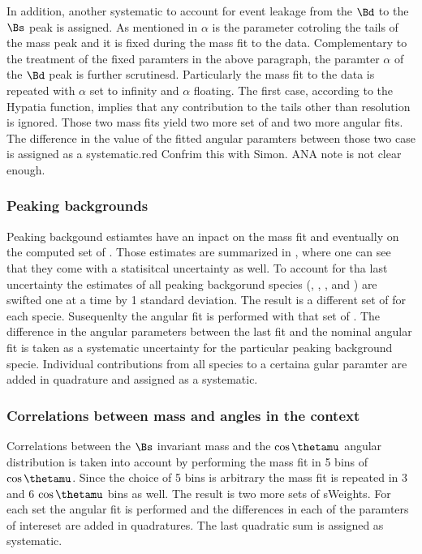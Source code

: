 In addition, another systematic to account for event leakage from the $\Bd$ to the $\Bs$ peak is assigned. As mentioned in 
$\alpha$ is the parameter cotroling the tails of the mass peak and it is fixed during the mass fit to the data. Complementary to the treatment of 
the fixed paramters in the above paragraph, the paramter $\alpha$ of the $\Bd$ peak is further scrutinesd. Particularly the mass fit to the data
is repeated with $\alpha$ set to infinity and $\alpha$ floating. The first case, according to the Hypatia function, implies that any contribution
to the tails other than resolution is ignored. Those two mass fits yield two more set of \sWeights and two more angular fits. The difference in 
the value of the fitted angular paramters between those two case is assigned as a systematic.{{red} Confrim this with Simon. ANA note is not clear enough.}


\subsubsection{Peaking backgrounds}
\label{systPeakBkg}
Peaking backgound estiamtes have an inpact on the mass fit and eventually on the computed set of \sWeights.
Those estimates are summarized in \tabref{}, where one can see that they come with a statisitcal uncertainty as well.
To account for tha last uncertainty  the estimates of all peaking backgorund species (\BsJpsiKK, \BsJpsipipi, \BdJpsipipi, and \LbJpsipK)
are swifted one at a time by 1 standard deviation. The result is a different set of \sWeights for each specie.
Susequenlty the angular fit is performed with that set of \sWeights. The difference in the angular parameters
between the last fit and the nominal angular fit is taken as a systematic uncertainty for the particular peaking background specie.
Individual contributions from all species to a certaina gular paramter are added in quadrature and assigned as a systematic.


\subsubsection{Correlations between mass and angles in the \sPlot context}
\label{systCorrs}
Correlations between the $\Bs$ invariant mass and the $\cos\thetamu$ angular distribution is taken into account
by performing the mass fit in 5 bins of $\cos\thetamu$. Since the choice of 5 bins is arbitrary the mass fit is
repeated in 3 and 6 $\cos\thetamu$ bins as well. The result is two more sets of sWeights. For each set the angular
fit is performed and the differences in each of the paramters of intereset are added in quadratures. The last quadratic
sum is assigned as systematic. 


